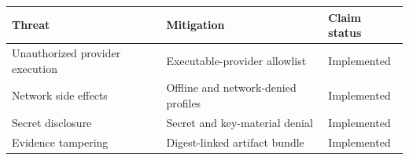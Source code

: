 \begin{tabularx}{\linewidth}{@{}XXX@{}}
\toprule
Threat & Mitigation & Claim status \\
\midrule
Unauthorized provider execution & Executable-provider allowlist & Implemented \\
Network side effects & Offline and network-denied profiles & Implemented \\
Secret disclosure & Secret and key-material denial & Implemented \\
Evidence tampering & Digest-linked artifact bundle & Implemented \\
\bottomrule
\end{tabularx}
